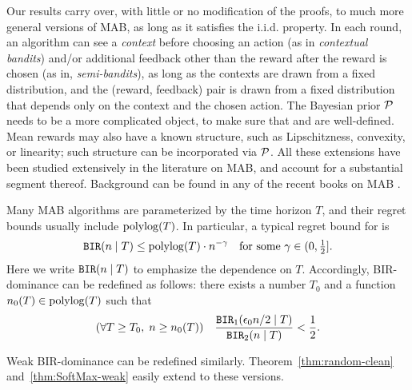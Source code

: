  Our results carry over, with little or no modification of the proofs, to much more general versions of MAB, as long as it satisfies the i.i.d. property. In each round, an algorithm can see a \emph{context} before choosing an action (as in \emph{contextual bandits}) and/or additional feedback other than the reward after the reward is chosen (as in, \eg \emph{semi-bandits}), as long as the contexts are drawn from a fixed distribution, and the (reward, feedback) pair is drawn from a fixed distribution that depends only on the context and the chosen action. The Bayesian prior $\mathcal{P}$ needs to be a more complicated object, to make sure that \PMR and \BIR are well-defined. Mean rewards may also have a known structure, such as Lipschitzness, convexity, or linearity; such structure can be incorporated via $\mathcal{P}$. All these extensions have been studied extensively in the literature on MAB, and account for a substantial segment thereof. Background can be found in any of the recent books on MAB \citep{Bubeck-survey12,slivkins-MABbook,LS19bandit-book}.


Many MAB algorithms are parameterized by the time horizon $T$, and their regret bounds usually include $\polylog(T)$. In particular,  a typical regret bound for \BIR is
\begin{align}
    \BIR(n\mid T)\leq \polylog(T)\cdot n^{-\gamma}
    \quad \text{for some $\gamma\in(0,\tfrac12]$}.
\end{align}
Here we write $\mathtt{BIR}(n\mid T)$ to emphasize the dependence on $T$. Accordingly, BIR-dominance can be redefined as follows: there exists a number $T_0$ and a function $n_0(T)\in \polylog(T)$
such that
\begin{align}\label{eq:random-better-messy}
(\forall T\geq T_0,\; n\geq n_0(T)) \quad
\frac{\mathtt{BIR}_1(\epsilon_0 n /2\mid T)}{\mathtt{BIR}_2(n\mid T)} <\frac12.
\end{align}

\noindent Weak BIR-dominance can be redefined similarly.
Theorem~\ref{thm:random-clean} and~\ref{thm:SoftMax-weak} easily extend to these versions.





